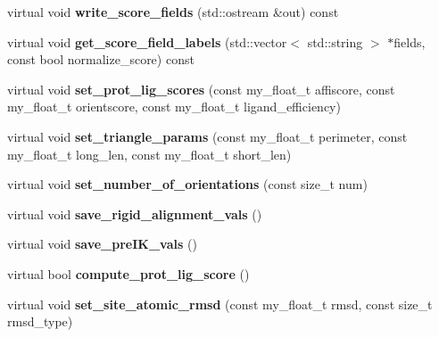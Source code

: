 \begin{CompactItemize}
\item 
virtual void \textbf{write\_\-score\_\-fields} (std::ostream \&out) const \label{classSimSite3D_1_1rigid__align__t_c02636bc474643f5ceb468212ce470db}

\item 
virtual void \textbf{get\_\-score\_\-field\_\-labels} (std::vector$<$ std::string $>$ $\ast$fields, const bool normalize\_\-score) const \label{classSimSite3D_1_1rigid__align__t_c276978bf665b4f8899893f929333acf}

\item 
virtual void \textbf{set\_\-prot\_\-lig\_\-scores} (const my\_\-float\_\-t affiscore, const my\_\-float\_\-t orientscore, const my\_\-float\_\-t ligand\_\-efficiency)\label{classSimSite3D_1_1rigid__align__t_ab98b09f549c3700c63a772e495c8858}

\item 
virtual void \textbf{set\_\-triangle\_\-params} (const my\_\-float\_\-t perimeter, const my\_\-float\_\-t long\_\-len, const my\_\-float\_\-t short\_\-len)\label{classSimSite3D_1_1rigid__align__t_46db34052a8e92e8b9455b4d3adc4fa4}

\item 
virtual void \textbf{set\_\-number\_\-of\_\-orientations} (const size\_\-t num)\label{classSimSite3D_1_1rigid__align__t_482bac50e100ac69fb62edd5b3ff6775}

\item 
virtual void \textbf{save\_\-rigid\_\-alignment\_\-vals} ()\label{classSimSite3D_1_1rigid__align__t_b05738bb2695109d10c7b553ac7b4e42}

\item 
virtual void \textbf{save\_\-pre\-IK\_\-vals} ()\label{classSimSite3D_1_1rigid__align__t_8d323747e24f9374c1a94b364c3c415d}

\item 
virtual bool \textbf{compute\_\-prot\_\-lig\_\-score} ()\label{classSimSite3D_1_1rigid__align__t_b14c62f28834c0c953753b108954052e}

\item 
virtual void \textbf{set\_\-site\_\-atomic\_\-rmsd} (const my\_\-float\_\-t rmsd, const size\_\-t rmsd\_\-type)\label{classSimSite3D_1_1rigid__align__t_7f27991120704fa2a19cb8a7cf31ce55}

\end{CompactItemize}
